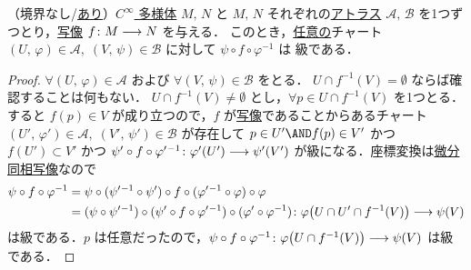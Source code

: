 \documentclass[geometry_main]{subfiles}
\begin{document}
\begin{mylem}[label=lem:cinfty_map]{}
	（境界なし/\hyperref[def:mani-with-boundary]{あり}）\hyperref[diffmani]{$C^\infty$ 多様体} $M,\, N$ と $M,\, N$ それぞれの\hyperref[diffmani]{\cinfty アトラス} $\mathcal{A},\, \mathcal{B}$ を1つずつとり，\hyperref[def.cinfty_mapping]{\cinfty 写像} $f \colon M \longrightarrow N$ を与える．
	このとき，\underline{任意の}チャート $(U,\, \varphi) \in \mathcal{A},\; (V,\, \psi) \in \mathcal{B}$ に対して $\psi \circ f  \circ \varphi^{-1}$ は \cinfty 級である．
\end{mylem}

\begin{proof}
	$\forall (U,\, \varphi) \in \mathcal{A}$ および $\forall (V,\, \psi) \in \mathcal{B}$ をとる．
	$U \cap f^{-1}(V) = \emptyset$ ならば確認することは何もない．
	$U \cap f^{-1}(V) \neq \emptyset$ とし，$\forall p \in U \cap f^{-1}(V)$ を1つとる．すると $f(p) \in V$ が成り立つので，$f$ が\hyperref[def.cinfty_mapping]{\cinfty 写像}であることからあるチャート $(U',\, \varphi') \in \mathcal{A},\; (V',\, \psi') \in \mathcal{B}$ が存在して
	$p \in U' \AND f(p) \in V'$ かつ $f(U') \subset V'$ かつ $\psi' \circ f \circ \varphi'{}^{-1} \colon \varphi'(U') \longrightarrow \psi'(V')$ が\cinfty 級になる．座標変換は\hyperref[def.diffeomo]{微分同相写像}なので
	\begin{align}
		\psi \circ f  \circ \varphi^{-1} &= \psi \circ (\psi'{}^{-1} \circ \psi') \circ f \circ (\varphi'{}^{-1} \circ \varphi) \circ \varphi \\
		&= (\psi \circ \psi'{}^{-1}) \circ (\psi' \circ f \circ \varphi'{}^{-1}) \circ (\varphi' \circ \varphi^{-1}) \colon \varphi\bigl(U \cap U' \cap f^{-1}(V)\bigr) \longrightarrow \psi (V)
	\end{align}
	は\cinfty 級である．$p$ は任意だったので，$\psi \circ f \circ \varphi^{-1} \colon \varphi\bigl(U \cap f^{-1}(V)\bigr) \longrightarrow \psi(V)$ は\cinfty 級である．
\end{proof}
\end{document}
